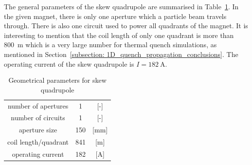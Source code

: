 The general parameters of the skew quadrupole are summarised in Table~\ref{table:skew_quad_params_table}. In the given magnet, there is only one aperture which a particle beam travels through. There is also one circuit used to power all quadrants of the magnet. It is interesting to mention that the coil length of only one quadrant is more than 800~m which is a very large number for thermal quench simulations, as mentioned in Section~\ref{subsection: 1D_quench_propagation_conclusions}. The operating current of the skew quadrupole is $I=182~\text{A}$.

\begin{table}[H]
    \caption{Geometrical parameters for skew quadrupole \cite{hl_lhc_tech_design_report_v01, marco_prioli_mails}} 
    \vspace{-1.em} 
    \fontsize{10}{10}
    \selectfont 
    \renewcommand{\arraystretch}{1.5}
    \begin{center}
    \begin{tabular}{ ccc }  
    \hline
    number of apertures & 1 & [-] \\
    number of circuits & 1 & [-] \\
    aperture size & 150 & [mm]\\
    coil length/quadrant & 841 & [m] \\
    operating current & 182 & [A] \\
    \hline 
    \end{tabular}
    \end{center}  
     \label{table:skew_quad_params_table} 
 \end{table}